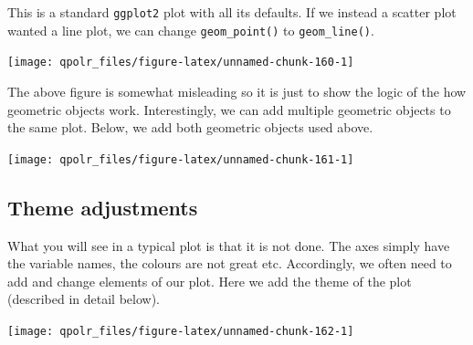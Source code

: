 \documentclass[12pt,oneside]{reedthesis}
\theoremstyle{definition}
\theoremstyle{definition}
\theoremstyle{definition}
\theoremstyle{remark}
\begin{document}
  This is a standard \texttt{ggplot2} plot with all its defaults. If we
  instead a scatter plot wanted a line plot, we can change
  \texttt{geom\_point()} to \texttt{geom\_line()}.
  \begin{Shaded}
  \begin{Highlighting}[]
  \NormalTok{(}\OperatorTok{+}
  \StringTok{  }\NormalTok{()}
  \end{Highlighting}
  \end{Shaded}
  \begin{center}\texttt{[image: qpolr\_files/figure-latex/unnamed-chunk-160-1]} \end{center}
  
  The above figure is somewhat misleading so it is just to show the logic
  of the how geometric objects work. Interestingly, we can add multiple
  geometric objects to the same plot. Below, we add both geometric objects
  used above.
  \begin{Shaded}
  \begin{Highlighting}[]
  \NormalTok{(}\OperatorTok{+}
  \StringTok{  }\NormalTok{() }\OperatorTok{+}
  \StringTok{  }\NormalTok{()}
  \end{Highlighting}
  \end{Shaded}
  \begin{center}\texttt{[image: qpolr\_files/figure-latex/unnamed-chunk-161-1]} \end{center}
  
  \subsection{Theme adjustments}\label{theme-adjustments}
  
  What you will see in a typical plot is that it is not done. The axes
  simply have the variable names, the colours are not great etc.
  Accordingly, we often need to add and change elements of our plot. Here
  we add the theme of the plot (described in detail below).
  \begin{Shaded}
  \begin{Highlighting}[]
  \NormalTok{(}\OperatorTok{+}
  \StringTok{  }\NormalTok{() }\OperatorTok{+}
  \StringTok{  }\NormalTok{()}
  \end{Highlighting}
  \end{Shaded}
  \begin{center}\texttt{[image: qpolr\_files/figure-latex/unnamed-chunk-162-1]} \end{center}
  
\end{document}
